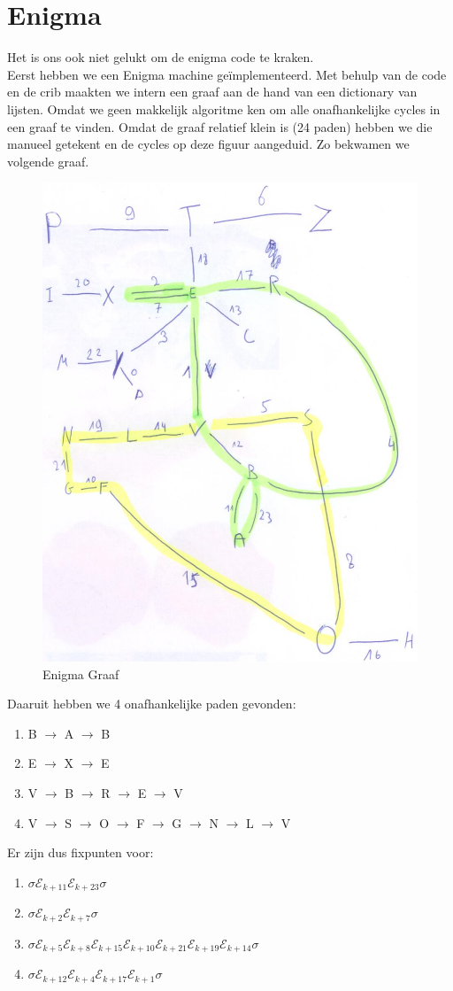 \documentclass[fleqn]{article}
\begin{document}
	\section{Enigma}
	Het is ons ook niet gelukt om de enigma code te kraken.\\
	Eerst hebben we een Enigma machine ge\"{i}mplementeerd. Met behulp van de code en de crib maakten we intern een graaf aan de hand van een dictionary van lijsten. Omdat we geen makkelijk algoritme ken om alle onafhankelijke cycles in een graaf te vinden. Omdat de graaf relatief klein is (24 paden) hebben we die manueel getekent en de cycles op deze figuur aangeduid. Zo bekwamen we volgende graaf. 
	\begin{figure}[h!]
		\centering
		\includegraphics[width=0.5\linewidth]{Enigma}
		\caption[]{Enigma Graaf}
		\label{fig:enigma}
	\end{figure}
	
	Daaruit hebben we 4 onafhankelijke paden gevonden:
	\begin{enumerate}
		\item B $\rightarrow$ A $\rightarrow$ B
		\item E $\rightarrow$ X $\rightarrow$ E
		\item V $\rightarrow$ B $\rightarrow$ R $\rightarrow$ E $\rightarrow$ V
		\item V $\rightarrow$ S $\rightarrow$ O $\rightarrow$ F $\rightarrow$ G $\rightarrow$ N $\rightarrow$ L $\rightarrow$ V
	\end{enumerate}
	
	Er zijn dus fixpunten voor:
	\begin{enumerate}
		\item $\sigma \mathcal{E}_{k+11} \mathcal{E}_{k+23} \sigma$
		\item $\sigma \mathcal{E}_{k+2} \mathcal{E}_{k+7} \sigma$
		\item $\sigma \mathcal{E}_{k+5} \mathcal{E}_{k+8} \mathcal{E}_{k+15} \mathcal{E}_{k+10} \mathcal{E}_{k+21} \mathcal{E}_{k+19} \mathcal{E}_{k+14}\sigma$
		\item $\sigma \mathcal{E}_{k+12} \mathcal{E}_{k+4} \mathcal{E}_{k+17} \mathcal{E}_{k+1} \sigma$
	\end{enumerate}
	
\end{document}
